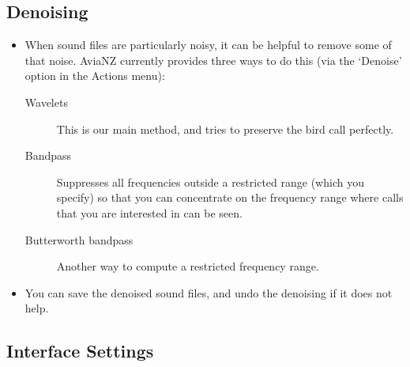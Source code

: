 \documentclass{article}
\begin{document}
\subsection{Denoising}\label{sec:denoising}

\begin{itemize}
\item When sound files are particularly noisy, it can be helpful to remove some of that noise. AviaNZ currently provides three ways to do this (via the `Denoise' option in the Actions menu):
\begin{description}
\item[Wavelets] This is our main method, and tries to preserve the bird call perfectly. 
\item[Bandpass] Suppresses all frequencies outside a restricted range (which you specify) so that you can concentrate on the frequency range where calls that you are interested in can be seen.
\item[Butterworth bandpass] Another way to compute a restricted frequency range.
\end{description}
\item You can save the denoised sound files, and undo the denoising if it does not help.
\end{itemize}

\subsection{Interface Settings}\label{sec:interfacesettings}
\end{document}
